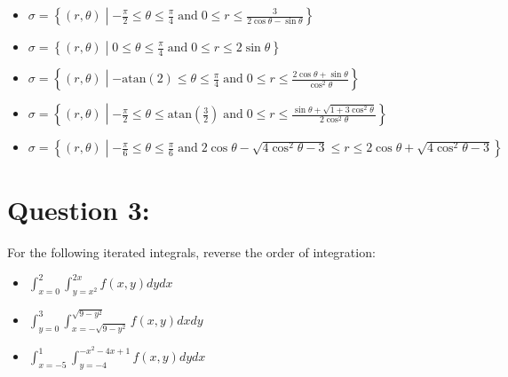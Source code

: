 \documentclass{article}
\newcommand{\atan}{\text{atan}}
\begin{document}
\begin{itemize}
\item \(\sigma = \left\{(r,\theta) \middle| -\frac{\pi}{2} \leq \theta \leq \frac{\pi}{4} \;\text{and}\; 0 \leq r \leq \frac{3}{2\cos\theta - \sin\theta}\right\}\)
\item \(\sigma = \left\{(r,\theta) \middle| 0 \leq \theta \leq \frac{\pi}{4} \;\text{and}\; 0 \leq r \leq 2\sin\theta\right\}\)
\item \(\sigma = \left\{(r,\theta) \middle| -\atan(2) \leq \theta \leq \frac{\pi}{4} \;\text{and}\; 0 \leq r \leq \frac{2\cos\theta + \sin\theta}{\cos^2\theta}\right\}\) 
\item \(\sigma = \left\{(r,\theta) \middle| -\frac{\pi}{2} \leq \theta \leq \atan(\frac{3}{2}) \;\text{and}\; 0 \leq r \leq \frac{\sin\theta + \sqrt{1 + 3\cos^2\theta}}{2\cos^2\theta}\right\}\)
\item \(\sigma = \left\{(r,\theta) \middle| -\frac{\pi}{6} \leq \theta \leq \frac{\pi}{6} \;\text{and}\; 2\cos\theta - \sqrt{4\cos^2\theta - 3} \leq r \leq 2\cos\theta + \sqrt{4\cos^2\theta - 3}\right\}\)
\end{itemize}




\section*{Question 3:}

For the following iterated integrals, reverse the order of integration:

\begin{itemize}
\item \(\int_{x = 0}^2 \int_{y = x^2}^{2x} f(x,y)dydx\)
\item \(\int_{y = 0}^3 \int_{x = -\sqrt{9 - y^2}}^{\sqrt{9 - y^2}} f(x,y)dxdy\)
\item \(\int_{x = -5}^1 \int_{y = -4}^{-x^2 - 4x + 1} f(x,y)dydx\)
\end{itemize}
\end{document}
